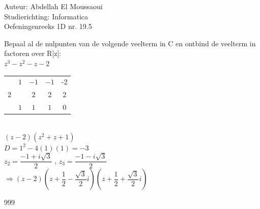 \documentclass[a4paper]{article}
\begin{document}
  
\noindent \large Auteur: Abdellah El Moussaoui \\
\noindent \large Studierichting: Informatica\\
\noindent \large Oefeningenreeks 1D nr. 19.5\\

\medskip

\normalsize

Bepaal al de nulpunten van de volgende veelterm in C en ontbind de veelterm in factoren over R[z]: \\

$z^3 - z^2 - z - 2$\\

\begin{tabular}{c|cccc} 
& $1$ & $-1$ & $-1$ & -2\\ 
$2$ & & $2$ & $2$ & 2\\ \hline 
& $1$ & $1$ & $1$ & 0 
\end{tabular}\\

$(z-2)(z^2+z+1)$\\

$D=1^2-4(1)(1) = -3$ \\

$z_2 = \dfrac{-1+i\sqrt{3}}{2}$ , $z_3 = \dfrac{-1-i\sqrt{3}}{2}$\\

$\Rightarrow \left(z-2\right)\left(z + \dfrac{1}{2} - \dfrac{\sqrt{3}}{2}i\right)\left(z + \dfrac{1}{2} + \dfrac{\sqrt{3}}{2}i\right)$\\

\begin{thebibliography}{999}
\end{thebibliography}
\end{document}
